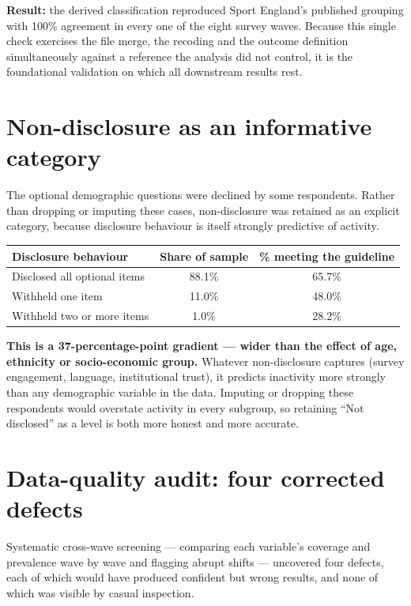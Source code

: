 \documentclass[ %
                    author={Ashrey Ashrey, Sanya Kapoor, Trisha Sharma, Yash Bhooshan Pandloskar},
                supervisor={Dr. Dalila O’Grady},
                    degree={MSc},
                     title={Using machine learning to forecast physical activity participation, volunteering and activity patterns in London},
                  subtitle={},
                      type={},
                      year={2021}]{dissertation}
\begin{document}
\noindent
\textbf{Result:} the derived classification reproduced Sport England's published grouping with 100\% agreement in every one of the eight survey waves. Because this single check exercises the file merge, the recoding and the outcome definition simultaneously against a reference the analysis did not control, it is the foundational validation on which all downstream results rest.

\section{Non-disclosure as an informative category}

\noindent
The optional demographic questions were declined by some respondents. Rather than dropping or imputing these cases, non-disclosure was retained as an explicit category, because disclosure behaviour is itself strongly predictive of activity.

\begin{table}[!htb]
\centering
\begin{tabular}{lcc}
\toprule
\textbf{Disclosure behaviour} & \textbf{Share of sample} & \textbf{\% meeting the guideline} \\
\midrule
Disclosed all optional items & 88.1\% & 65.7\% \\
Withheld one item & 11.0\% & 48.0\% \\
Withheld two or more items & 1.0\% & 28.2\% \\
\bottomrule
\end{tabular}
\end{table}

\noindent
\textbf{This is a 37-percentage-point gradient --- wider than the effect of age, ethnicity or socio-economic group.} Whatever non-disclosure captures (survey engagement, language, institutional trust), it predicts inactivity more strongly than any demographic variable in the data. Imputing or dropping these respondents would overstate activity in every subgroup, so retaining ``Not disclosed'' as a level is both more honest and more accurate.

\section{Data-quality audit: four corrected defects}

\noindent
Systematic cross-wave screening --- comparing each variable's coverage and prevalence wave by wave and flagging abrupt shifts --- uncovered four defects, each of which would have produced confident but wrong results, and none of which was visible by casual inspection.
\end{document}
